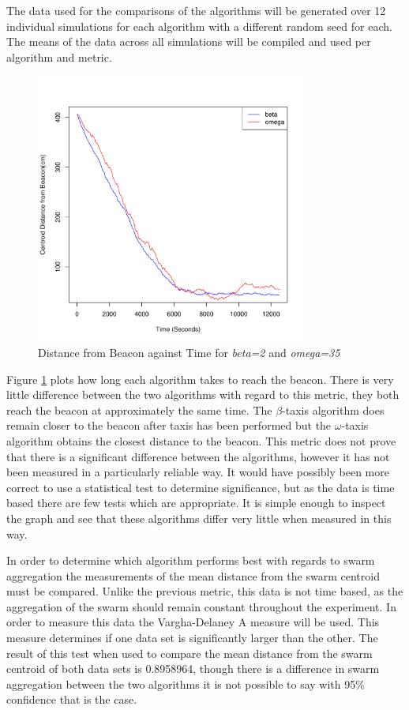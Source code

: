 \documentclass[conference]{IEEEtran}
\begin{document}
The data used for the comparisons of the algorithms will be generated over 12 individual simulations for each algorithm with a different random seed for each. The means of the data across all simulations will be compiled and used per algorithm and metric. 

\begin{figure}[!t]
\centering
\includegraphics[width=3.5in]{figures/comparison_beacon_distance.pdf}
\caption{Distance from Beacon against Time for \textit{beta=2} and \textit{omega=35}}
\label{comparison_beacon_distance}
\end{figure}

Figure \ref{comparison_beacon_distance} plots how long each algorithm takes to reach the beacon. There is very little difference between the two algorithms with regard to this metric, they both reach the beacon at approximately the same time. The $\beta$-taxis algorithm does remain closer to the beacon after taxis has been performed but the $\omega$-taxis algorithm obtains the closest distance to the beacon. This metric does not prove that there is a significant difference between the algorithms, however it has not been measured in a particularly reliable way. It would have possibly been more correct to use a statistical test to determine significance, but as the data is time based there are few tests which are appropriate. It is simple enough to inspect the graph and see that these algorithms differ very little when measured in this way. 

In order to determine which algorithm performs best with regards to swarm aggregation the measurements of the mean distance from the swarm centroid must be compared. Unlike the previous metric, this data is not time based, as the aggregation of the swarm should remain constant throughout the experiment. In order to measure this data the Vargha-Delaney A measure will be used. This measure determines if one data set is significantly larger than the other. The result of this test when used to compare the mean distance from the swarm centroid of both data sets is 0.8958964, though there is a difference in swarm aggregation between the two algorithms it is not possible to say with 95\% confidence that is the case. 
\end{document}

